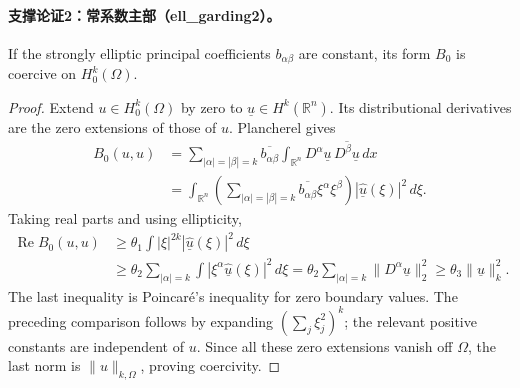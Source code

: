 \paragraph{支撑论证2：常系数主部（ell\_garding2）。}
If the strongly elliptic principal coefficients $b_{\alpha\beta}$ are
constant, its form $B_0$ is coercive on $H^k_0(\Omega)$.
\begin{proof}
Extend $u\in H^k_0(\Omega)$ by zero to $\underline u\in H^k(\mathbb R^n)$.
Its distributional derivatives are the zero extensions of those of $u$.
Plancherel gives
\begin{align*}
B_0(u,u)
&=\sum_{|\alpha|=|\beta|=k}\overline{b_{\alpha\beta}}
  \int_{\mathbb R^n}D^\alpha\underline u\,
              \overline{D^\beta\underline u}\,dx\\
&=\int_{\mathbb R^n}
 \left(\sum_{|\alpha|=|\beta|=k}\overline{b_{\alpha\beta}}\xi^\alpha\xi^\beta\right)
 |\widehat{\underline u}(\xi)|^2\,d\xi.
\end{align*}
Taking real parts and using ellipticity,
\begin{align*}
\operatorname{Re}B_0(u,u)
&\geq\theta_1\int |\xi|^{2k}|\widehat{\underline u}(\xi)|^2\,d\xi\\
&\geq\theta_2\sum_{|\alpha|=k}\int
 |\xi^\alpha\widehat{\underline u}(\xi)|^2\,d\xi
=\theta_2\sum_{|\alpha|=k}\|D^\alpha\underline u\|_2^2
\geq\theta_3\|\underline u\|_k^2.
\end{align*}
The last inequality is Poincar\'e's inequality for zero boundary values.
The preceding comparison follows by expanding $(\sum_j\xi_j^2)^k$;
the relevant positive constants are independent of $u$.
Since all these zero extensions vanish off $\Omega$, the last norm
is $\|u\|_{k,\Omega}$, proving coercivity.
\end{proof}
